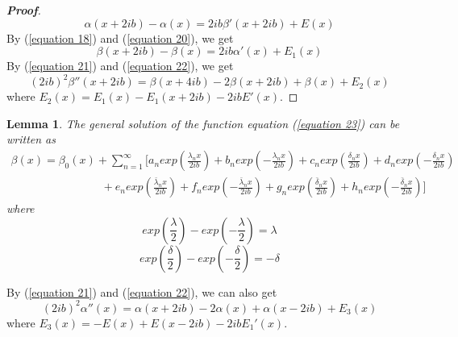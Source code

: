 \documentclass[a4paper]{article}      %
\begin{document}
\begin{proof}[{\bf Proof}]
\begin{equation}
    \alpha(x+2ib)-\alpha(x)=2ib\beta'(x+2ib)+E(x)
    \end{equation}
    By (\ref{equation 18}) and (\ref{equation 20}), we get
    \begin{equation}\label{equation 22}                                     %
    \beta(x+2ib)-\beta(x)=2ib\alpha'(x)+E_{1}(x)
    \end{equation}
    By (\ref{equation 21}) and (\ref{equation 22}), we get
    \begin{equation}\label{equation 23}                                     %
    (2ib)^{2}\beta''(x+2ib)=\beta(x+4ib)-2\beta(x+2ib)+\beta(x)+E_{2}(x)
    \end{equation}
    where $E_{2}(x)=E_{1}(x)-E_{1}(x+2ib)-2ibE'(x)$.
\end{proof}
\newtheorem{lemma}[theorem]{Lemma}
\begin{lemma}\label{lemma 1}
    The general solution of the function equation (\ref{equation 23}) can be written as
    \begin{equation}\label{equation 24}                                     %
       \begin{array}{l}
        \beta (x) = {\beta _0}(x) + \sum\limits_{n = 1}^\infty  {[{a_n}exp(\frac{{{\lambda _n}x}}{{2ib}}) + {b_n}exp( - \frac{{{\lambda _n}x}}{{2ib}}) + {c_n}exp(\frac{{{\delta _n}x}}{{2ib}}) + {d_n}exp( - \frac{{{\delta _n}x}}{{2ib}})} \\
        \qquad\qquad \qquad \qquad +{e_n}exp(\frac{{{{\bar \lambda }_n}x}}{{2ib}}) + {f_n}exp( - \frac{{{{\bar \lambda }_n}x}}{{2ib}}) + {g_n}exp(\frac{{{{\bar \delta }_n}x}}{{2ib}}) + {h_n}exp( - \frac{{{{\bar \delta }_n}x}}{{2ib}})]
        \end{array}
    \end{equation}
where
    \begin{equation}\label{equation 25}                                     %
    exp(\frac{\lambda}{2})-exp(-\frac{\lambda}{2})=\lambda
    \end{equation}
    \begin{equation}\label{equation 26}                                     %
    exp(\frac{\delta}{2})-exp(-\frac{\delta}{2})=-\delta
    \end{equation}
\end{lemma}
 By (\ref{equation 21}) and (\ref{equation 22}), we can also get
    \begin{equation}\label{equation 27}                                     %
    (2ib)^{2}\alpha''(x)=\alpha(x+2ib)-2\alpha(x)+\alpha(x-2ib)+E_{3}(x)
    \end{equation}
    where $E_{3}(x)=-E(x)+E(x-2ib)-2ibE_{1}'(x)$.
\end{document}
